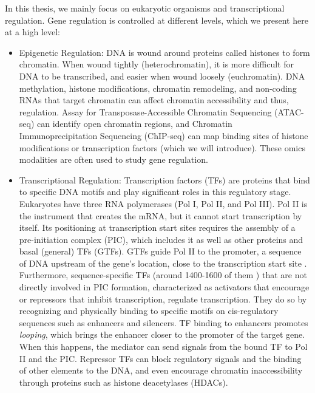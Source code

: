 In this thesis, we mainly focus on eukaryotic organisms and transcriptional regulation. Gene regulation is controlled at different levels, which we present here at a high level:

\begin{itemize}
\item Epigenetic Regulation: DNA is wound around proteins called histones to form chromatin. When wound tightly (heterochromatin), it is more difficult for DNA to be transcribed, and easier when wound loosely (euchromatin). DNA methylation, histone modifications, chromatin remodeling, and non-coding RNAs that target chromatin can affect chromatin accessibility and thus, regulation. Assay for Transposase-Accessible Chromatin Sequencing (ATAC-seq) \cite{buenrostro2013transposition} can identify open chromatin regions, and Chromatin Immunoprecipitation Sequencing (ChIP-seq) \cite{johnson2007genome} can map binding sites of histone modifications or transcription factors (which we will introduce). These omics modalities are often used to study gene regulation.
\item Transcriptional Regulation: Transcription factors (TFs) are proteins that bind to specific DNA motifs and play significant roles in this regulatory stage. Eukaryotes have three RNA polymerases (Pol I, Pol II, and Pol III). Pol II is the instrument that creates the mRNA, but it cannot start transcription by itself. Its positioning at transcription start sites requires the assembly of a pre-initiation complex (PIC), which includes it as well as other proteins and basal (general) TFs (GTFs). GTFs guide Pol II to the promoter, a sequence of DNA upstream of the gene’s location,  close to the transcription start site \cite{thomas2006general}. Furthermore, sequence-specific TFs (around 1400-1600 of them \cite{lambert2018human}) that are not directly involved in PIC formation, characterized as activators that encourage or repressors that inhibit transcription, regulate transcription. They do so by recognizing and physically binding to specific motifs on cis-regulatory sequences such as enhancers and silencers. TF binding to enhancers promotes \textit{looping}, which brings the enhancer closer to the promoter of the target gene. When this happens, the mediator can send signals from the bound TF to Pol II and the PIC. Repressor TFs can block regulatory signals and the binding of other elements to the DNA, and even encourage chromatin inaccessibility through proteins such as histone deacetylases (HDACs).


\end{itemize}
